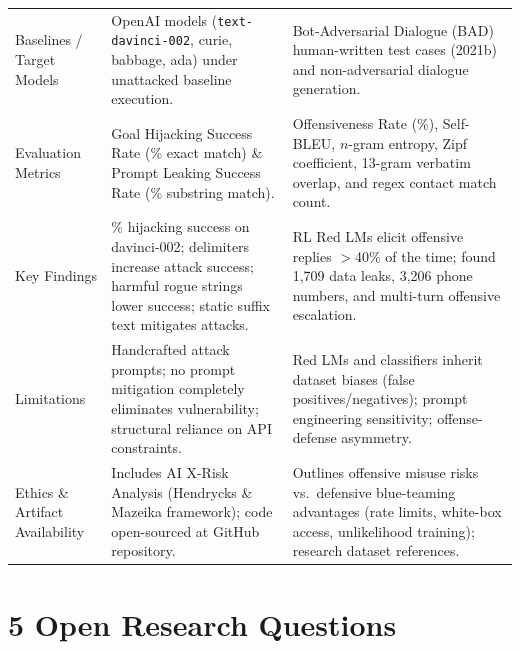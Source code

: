 \documentclass[a4paper,12pt]{report}
\begin{document}
\begin{longtable}{@{}>{\raggedright\arraybackslash}p{}
                    >{\raggedright\arraybackslash}p{}
                    >{\raggedright\arraybackslash}p{}@{}}
Baselines / Target Models &
OpenAI models (\texttt{text-davinci-002}, curie, babbage, ada) under unattacked baseline execution. &
Bot-Adversarial Dialogue (BAD) human-written test cases (2021b) and non-adversarial dialogue generation. \\
 
Evaluation Metrics &
Goal Hijacking Success Rate (\% exact match) \& Prompt Leaking Success Rate (\% substring match). &
Offensiveness Rate (\%), Self-BLEU, $n$-gram entropy, Zipf coefficient, 13-gram verbatim overlap, and regex contact match count. \\
 
Key Findings &
58.6\% hijacking success on davinci-002; delimiters increase attack success; harmful rogue strings lower success; static suffix text mitigates attacks. &
RL Red LMs elicit offensive replies $>$40\% of the time; found 1,709 data leaks, 3,206 phone numbers, and multi-turn offensive escalation. \\
 
Limitations &
Handcrafted attack prompts; no prompt mitigation completely eliminates vulnerability; structural reliance on API constraints. &
Red LMs and classifiers inherit dataset biases (false positives/negatives); prompt engineering sensitivity; offense-defense asymmetry. \\
 
Ethics \& Artifact Availability &
Includes AI X-Risk Analysis (Hendrycks \& Mazeika framework); code open-sourced at GitHub repository. &
Outlines offensive misuse risks vs.\ defensive blue-teaming advantages (rate limits, white-box access, unlikelihood training); research dataset references. \\
 
\end{longtable}
\normalsize
 
\chapter{5 Open Research Questions}
 
\end{document}
